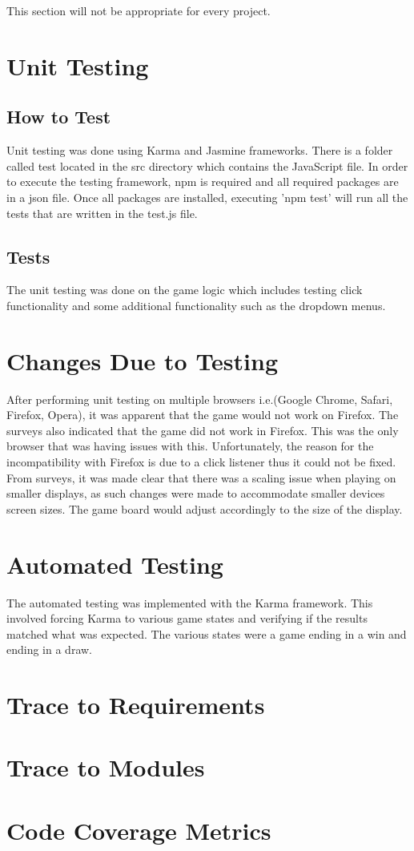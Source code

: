 \documentclass[12pt, titlepage]{article}
\begin{document}
This section will not be appropriate for every project.

\section{Unit Testing}
\subsection{How to Test}
Unit testing was done using Karma and Jasmine frameworks. There is a folder called test
located in the src directory which contains the JavaScript file. In order to execute the testing framework, 
npm is required and all required packages are in a json file. Once all packages are installed, 
executing 'npm test' will run all the tests that are written in the test.js file.
\subsection{Tests}
The unit testing was done on the game logic which includes testing click functionality and some additional functionality such as the dropdown menus.
\section{Changes Due to Testing}
After performing unit testing on multiple browsers i.e.(Google Chrome, Safari, Firefox, Opera),
it was apparent that the game would not work on Firefox. The surveys also indicated that the game did
not work in Firefox. This was the only browser that was having issues with this. Unfortunately,
the reason for the incompatibility with Firefox is due to a click listener thus it could not be fixed. From
surveys, it was made clear that there was a scaling issue when playing on smaller displays, as such
changes were made to accommodate smaller devices screen sizes. The game board would adjust 
accordingly to the size of the display. 
\section{Automated Testing}
The automated testing was implemented with the Karma framework. This involved forcing Karma
to various game states and verifying if the results matched what was expected. The various 
states were a game ending in a win and ending in a draw.
\section{Trace to Requirements}
		
\section{Trace to Modules}		

\section{Code Coverage Metrics}




\end{document}
